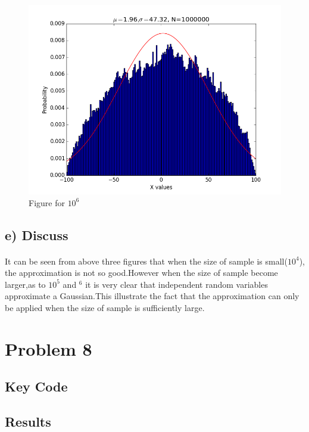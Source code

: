 \documentclass[]{article}
\begin{document}
            \begin{figure}[H]
                \centering
                \includegraphics[scale=0.5]{P6_1E6.png}
                \caption{Figure for $10^6$}
            \end{figure}
        \subsection{e) Discuss}
            \paragraph{} It can be seen from above three figures that when the size of sample is small($10^4$), the approximation is not so good.However when the size of sample become larger,as to $10^5$ and $^6$ it is very clear that independent random variables approximate a Gaussian.This illustrate the fact that the approximation can only be applied when the size of sample is sufficiently large.


    \section{Problem 8}
        \subsection{Key Code}
            
        \subsection{Results}
\end{document}
